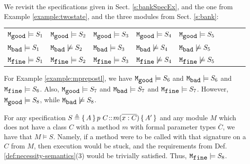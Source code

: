  \begin{example}
 \label{example:twostatesarisfy}
 {We   revisit the specifications given in Sect. \ref{s:bankSpecEx}, and the one from Example \ref{example:twostate}, and  the three  modules from Sect. \ref{s:bank}:}


\begin{tabular}{lllllllll}
$\ModA  \models S_1$  &   $\ModA  \models S_2$ &  $\ModA \models S_3$ &   $\ModA \models S_4$    & $\ModA \models S_5$\\
 $\ModB \models S_1$  &   $\ModB \not\models S_2$   &  $\ModB  \models S_3$   &  $\ModB  \not\models S_4$   & $\ModB \not\models S_5$ \\
 $\ModC  \models S_1$    & $\ModC \models S_2$ &   $\ModC \models S_3$    &$\ModC \not\models S_4$   & $\ModC \not\models S_5$ 
\end{tabular}
\end{example}
 

 
 \begin{example}
 \label{example:mprepostlsatissy}
 For  %
 Example \ref{example:mprepostl}, we have
  $\ModA \models S_6$ and $\ModB \models S_6$ and  $\ModC \models S_6$.
Also,  $\ModA \models S_7$ and $\ModB \models S_7$ and  $\ModC \models S_7$.
However,   $\ModA  \models S_8$, while $\ModB  \not\models S_8$.
\end{example}

 \begin{example}
\label{example:mprepostlsatissy}
 For  %
any   specification  $S \triangleq {\mprepost{A}{p\ C}{m}{x}{C}{A'} }$ and any module  $M$ which does not have a class $C$  with a method $m$ with formal parameter  types ${\overline C}$, we have that $M \models S$.
Namely, if a method were to be called with that signature on a $C$  from $M$, then execution would be stuck, and the requirements from Def. \ref{def:necessity-semantics}(3) would be trivially satisfied.
Thus,   $\ModC \models S_8$. %
\end{example}

 

